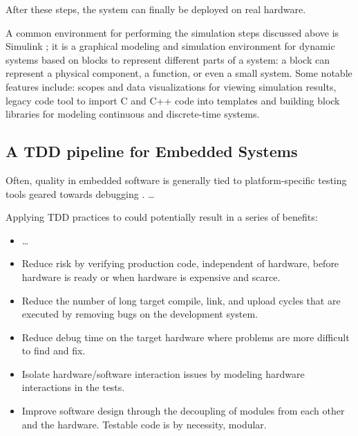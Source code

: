 After these steps, the system can finally be deployed on real hardware.

A common environment for performing the simulation steps discussed above is Simulink \cite{Simulink}; it is a graphical modeling and simulation environment for dynamic systems based on blocks to represent different parts of a system: a block can represent a physical component, a function, or even a small system. Some notable features include: scopes and data visualizations for viewing simulation results, legacy code tool to import C and C++ code into templates and building block libraries for modeling continuous and discrete-time systems.


\subsection{A TDD pipeline for Embedded Systems}
Often, quality in embedded software is generally tied to platform-specific testing tools geared towards debugging \cite{TDDEmbeddedSoftware}.
\dots


Applying TDD practices to \ess could potentially result in a series of benefits:
\begin{itemize}
    \item \dots
\end{itemize}


\begin{itemize}
    \item Reduce risk by verifying production code, independent of hardware, before hardware is ready or when hardware is expensive and scarce.
    \item Reduce the number of long target compile, link, and upload cycles that are executed by removing bugs on the development system.
    \item Reduce debug time on the target hardware where problems are more difficult to find and fix.
    \item Isolate hardware/software interaction issues by modeling hardware interactions in the tests.
    \item Improve software design through the decoupling of modules from each other and the hardware. Testable code is by necessity, modular.
\end{itemize}


